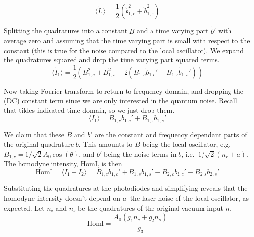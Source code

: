 \documentclass[aps,pra,superscriptaddress,reprint,nofootinbib]{revtex4-1}
\newcommand{\expect}[1]{\langle #1 \rangle}
\begin{document}
\begin{equation}
\expect{\tilde{I}_1} = \frac{1}{2} \left( \tilde{b}_{1,c}^2 + \tilde{b}_{1,s}^2 \right)
\end{equation}


Splitting the quadratures into a constant $B$ and a time varying part $\tilde{b}'$ with average zero and assuming that the time varying part is small with respect to the constant (this is true for the noise compared to the local oscillator). We expand the quadratures squared and drop the time varying part squared terms.
\begin{equation}
\expect{\tilde{I}_1} = \frac{1}{2} \left( B_{1,c}^2 + B_{1,s}^2 + 2 \left( B_{1,c} \tilde{b}_{1,c}' + B_{1,s} \tilde{b}_{1,s}' \right) \right)
\end{equation}


Now taking Fourier transform to return to frequency domain, and dropping the (DC) constant term since we are only interested in the quantum noise. Recall that tildes indicated time domain, so we just drop them.
\begin{equation}
\expect{I_1} = B_{1,c} b_{1,c}' + B_{1,s} b_{1,s}'
\end{equation}


We claim that these $B$ and $b'$ are the constant and frequency dependant parts of the original quadrature $b$. This amounts to $B$ being the local oscillator, e.g.\ $B_{1,c} = 1/\sqrt{2} A_0 \cos(\theta)$, and $b'$ being the noise terms in $b$, i.e.\ $1/\sqrt{2} (n_r \pm a)$. The homodyne intensity, $\mathrm{HomI}$, is then
\begin{equation}
\mathrm{HomI} = \expect{I_1 - I_2} = B_{1,c} b_{1,c}' + B_{1,s} b_{1,s}' - B_{2,c} b_{2,c}' - B_{2,s} b_{2,s}'
\end{equation}


Substituting the quadratures at the photodiodes and simplifying reveals that the homodyne intensity doesn’t depend on $a$, the laser noise of the local oscillator, as expected. Let $n_c$ and $n_s$ be the quadratures of the original vacuum input $n$.
\begin{equation}
\mathrm{HomI} = \frac{A_0(g_1 n_c + g_2 n_s)}{g_3}
\end{equation}
\end{document}
